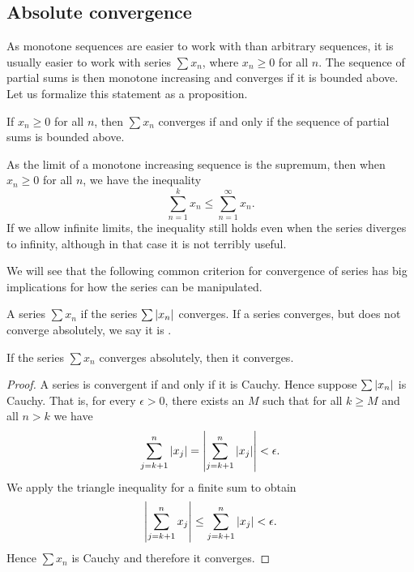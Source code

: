 \subsection{Absolute convergence}

As monotone sequences are easier to work with than arbitrary sequences, it
is usually easier to work with series $\sum x_n$, where $x_n \geq 0$ for
all $n$.  The sequence of partial sums is then monotone increasing
and converges if it is bounded above.
Let us formalize this statement as a proposition.

\begin{prop}
If $x_n \geq 0$ for all $n$, then $\sum x_n$ converges if and only if
the sequence of partial sums is bounded above.
\end{prop}

As the limit of a monotone increasing sequence is the supremum, then
when $x_n \geq 0$ for all $n$, we have the
inequality
\begin{equation*}
\sum_{n=1}^k x_n \leq
\sum_{n=1}^\infty x_n .
\end{equation*}
If we allow infinite limits, the inequality still
holds even when the series diverges to infinity, although in that case it is not
terribly useful.

We will see that the following common criterion for convergence of series 
has big implications for how the series can be manipulated.

\begin{defn}
A series $\sum x_n$
\emph{} if
the series $\sum \left\lvert {x_n} \right\rvert$ converges.
If a series converges, but does not converge absolutely, we say
it is \emph{}.
\end{defn}

\begin{prop}
If the series $\sum x_n$ converges absolutely, then it converges.
\end{prop}

\begin{proof}
A series is convergent if and only if it is Cauchy.  Hence
suppose $\sum \left\lvert {x_n} \right\rvert$ is Cauchy.  That is, for every $\epsilon > 0$,
there exists an $M$ such that for all $k \geq M$ and all $n > k$ we have 
\begin{equation*}
\sum_{j=k+1}^n \left\lvert {x_j} \right\rvert 
=
\left\lvert { \sum_{j=k+1}^n \left\lvert {x_j} \right\rvert } \right\rvert
<
\epsilon .
\end{equation*}
We apply the triangle inequality for a finite sum to obtain
\begin{equation*}
\left\lvert { \sum_{j=k+1}^n x_j } \right\rvert
\leq
\sum_{j=k+1}^n \left\lvert {x_j} \right\rvert
<
\epsilon .
\end{equation*}
Hence $\sum x_n$ is Cauchy and therefore it converges.
\end{proof}

